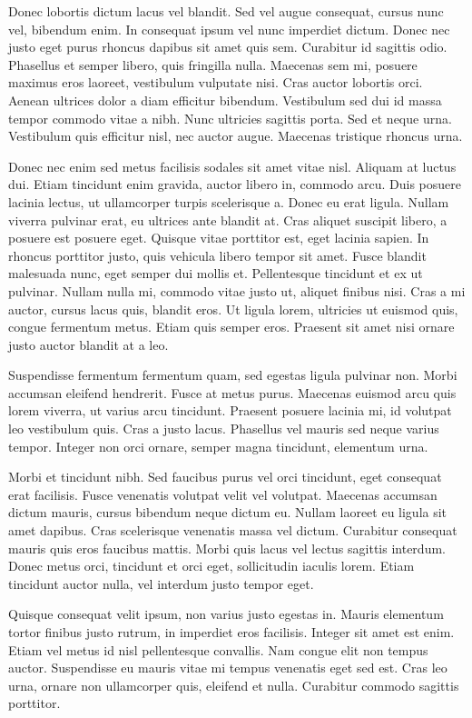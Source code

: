 \documentclass{article}
\begin{document}
Donec lobortis dictum lacus vel blandit. Sed vel augue consequat, cursus nunc vel, bibendum enim. In consequat ipsum vel nunc imperdiet dictum. Donec nec justo eget purus rhoncus dapibus sit amet quis sem. Curabitur id sagittis odio. Phasellus et semper libero, quis fringilla nulla. Maecenas sem mi, posuere maximus eros laoreet, vestibulum vulputate nisi. Cras auctor lobortis orci. Aenean ultrices dolor a diam efficitur bibendum. Vestibulum sed dui id massa tempor commodo vitae a nibh. Nunc ultricies sagittis porta. Sed et neque urna. Vestibulum quis efficitur nisl, nec auctor augue. Maecenas tristique rhoncus urna.

Donec nec enim sed metus facilisis sodales sit amet vitae nisl. Aliquam at luctus dui. Etiam tincidunt enim gravida, auctor libero in, commodo arcu. Duis posuere lacinia lectus, ut ullamcorper turpis scelerisque a. Donec eu erat ligula. Nullam viverra pulvinar erat, eu ultrices ante blandit at. Cras aliquet suscipit libero, a posuere est posuere eget. Quisque vitae porttitor est, eget lacinia sapien. In rhoncus porttitor justo, quis vehicula libero tempor sit amet. Fusce blandit malesuada nunc, eget semper dui mollis et. Pellentesque tincidunt et ex ut pulvinar. Nullam nulla mi, commodo vitae justo ut, aliquet finibus nisi. Cras a mi auctor, cursus lacus quis, blandit eros. Ut ligula lorem, ultricies ut euismod quis, congue fermentum metus. Etiam quis semper eros. Praesent sit amet nisi ornare justo auctor blandit at a leo.

Suspendisse fermentum fermentum quam, sed egestas ligula pulvinar non. Morbi accumsan eleifend hendrerit. Fusce at metus purus. Maecenas euismod arcu quis lorem viverra, ut varius arcu tincidunt. Praesent posuere lacinia mi, id volutpat leo vestibulum quis. Cras a justo lacus. Phasellus vel mauris sed neque varius tempor. Integer non orci ornare, semper magna tincidunt, elementum urna.

Morbi et tincidunt nibh. Sed faucibus purus vel orci tincidunt, eget consequat erat facilisis. Fusce venenatis volutpat velit vel volutpat. Maecenas accumsan dictum mauris, cursus bibendum neque dictum eu. Nullam laoreet eu ligula sit amet dapibus. Cras scelerisque venenatis massa vel dictum. Curabitur consequat mauris quis eros faucibus mattis. Morbi quis lacus vel lectus sagittis interdum. Donec metus orci, tincidunt et orci eget, sollicitudin iaculis lorem. Etiam tincidunt auctor nulla, vel interdum justo tempor eget.

Quisque consequat velit ipsum, non varius justo egestas in. Mauris elementum tortor finibus justo rutrum, in imperdiet eros facilisis. Integer sit amet est enim. Etiam vel metus id nisl pellentesque convallis. Nam congue elit non tempus auctor. Suspendisse eu mauris vitae mi tempus venenatis eget sed est. Cras leo urna, ornare non ullamcorper quis, eleifend et nulla. Curabitur commodo sagittis porttitor.
\end{document}
